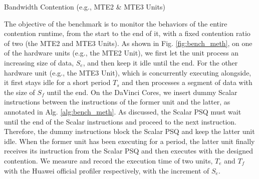 \begin{algorithm}[tbp]
    \caption{Bandwidth Contention (e.g., MTE2 \& MTE3 Units)}
    \label{alg:bench_meth}
        
        
    \BlankLine
            
    \BlankLine

\end{algorithm}

The objective of the benchmark is to monitor the behaviors of the entire contention runtime, from the start to the end of it, with a fixed contention ratio of two (the MTE2 and MTE3 Units). 
As shown in Fig. \ref{fig:bench_meth},
on one of the hardware units (e.g., the MTE2 Unit), we first let the unit process an increasing size of data, $S_{e}$, and then keep it idle until the end. For the other hardware unit (e.g., the MTE3 Unit), which is concurrently executing alongside, it first stays idle for a short period $T_{s}$ and then processes a segment of data with the size of $S_{f}$ until the end. 
On the DaVinci Cores, we insert dummy Scalar instructions between the instructions of the former unit and the latter, as annotated in Alg. \ref{alg:bench_meth}. 
As discussed, the Scalar PSQ must wait until the end of the Scalar instructions and proceed to the next instruction. Therefore, the dummy instructions block the Scalar PSQ and keep the latter unit idle. When the former unit has been executing for a period, the latter unit finally receives its instruction from the Scalar PSQ and then executes with the designed contention. We measure and record the execution time of two units, $T_{e}$ and $T_{f}$ with the Huawei official profiler respectively, with the increment of $S_{e}$.

